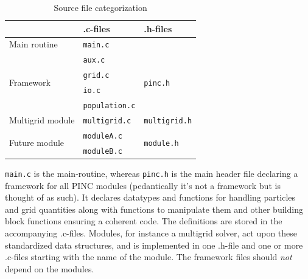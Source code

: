 \documentclass[10pt,a4paper]{article}
\begin{document}
\begin{table}
	\centering
	\caption{Source file categorization}
	\begin{tabular}{|l l l|}
		\hline
										& .c-files 				& .h-files 							\\
		\hline \hline
		Main routine						& \verb$main.c$			&									\\
		\hline
		\multirow{4}{*}{Framework}		& \verb$aux.c$			& \multirow{4}{*}{\texttt{pinc.h}}	\\
										& \verb$grid.c$			&									\\
										& \verb$io.c$			&									\\
										& \verb$population.c$	&									\\
		\hline \hline
		Multigrid module					& \verb$multigrid.c$		& \verb$multigrid.h$					\\
		\hline
		\multirow{2}{*}{Future module}	& \verb$moduleA.c$		& \multirow{2}{*}{\texttt{module.h}}	\\
										& \verb$moduleB.c$		& 									\\
		\hline
	\end{tabular}
	\label{tab:files}
\end{table}

\verb$main.c$ is the main-routine, whereas \verb$pinc.h$ is the main header file declaring a framework for all PINC modules (pedantically it's not a framework but is thought of as such). It declares datatypes and functions for handling particles and grid quantities along with functions to manipulate them and other building block functions ensuring a coherent code. The definitions are stored in the accompanying .c-files. Modules, for instance a multigrid solver, act upon these standardized data structures, and is implemented in one .h-file and one or more .c-files starting with the name of the module. The framework files should \emph{not} depend on the modules.
\end{document}
